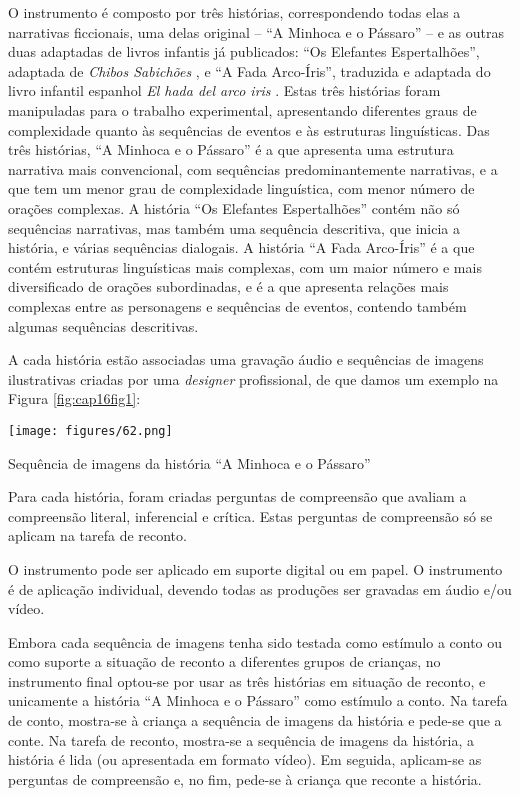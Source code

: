 \documentclass[output=paper,colorlinks,citecolor=brown,booklanguage=portuguese]{langscibook}
\begin{document}
O instrumento é composto por três histórias, correspondendo todas elas a narrativas ficcionais, uma delas original – “A Minhoca e o Pássaro” – e as outras duas adaptadas de livros infantis já publicados: “Os Elefantes Espertalhões”, adaptada de \emph{Chibos Sabichões} \citep{Gonzalez2016}, e “A Fada Arco-Íris”, traduzida e adaptada do livro infantil espanhol \emph{El hada del arco iris} \citep{Yebras2015}. Estas três histórias foram manipuladas para o trabalho experimental, apresentando diferentes graus de complexidade quanto às sequências de eventos e às estruturas linguísticas. Das três histórias, “A Minhoca e o Pássaro” é a que apresenta uma estrutura narrativa mais convencional, com sequências predominantemente narrativas, e a que tem um menor grau de complexidade linguística, com menor número de orações complexas. A história “Os Elefantes Espertalhões” contém não só sequências narrativas, mas também uma sequência descritiva, que inicia a história, e várias sequências dialogais. A história “A Fada Arco-Íris” é a que contém estruturas linguísticas mais complexas, com um maior número e mais diversificado de orações subordinadas, e é a que apresenta relações mais complexas entre as personagens e sequências de eventos, contendo também algumas sequências descritivas. 

A cada história estão associadas uma gravação áudio e sequências de imagens ilustrativas criadas por uma \emph{designer} profissional, de que damos um exemplo na Figura \ref{fig:cap16fig1}:
\begin{Figura}
    \texttt{[image: figures/62.png]}

    \caption{Sequência de imagens da história “A Minhoca e o Pássaro”}
    \label{fig:cap16fig1}
\end{Figura}

Para cada história, foram criadas perguntas de compreensão que avaliam a compreensão literal, inferencial e crítica. Estas perguntas de compreensão só se aplicam na tarefa de reconto.

O instrumento pode ser aplicado em suporte digital ou em papel. O instrumento é de aplicação individual, devendo todas as produções ser gravadas em áudio e/ou vídeo.

Embora cada sequência de imagens tenha sido testada como estímulo a conto ou como suporte a situação de reconto a diferentes grupos de crianças, no instrumento final optou-se por usar as três histórias em situação de reconto, e unicamente a história “A Minhoca e o Pássaro” como estímulo a conto. Na tarefa de conto, mostra-se à criança a sequência de imagens da história e pede-se que a conte. Na tarefa de reconto, mostra-se a sequência de imagens da história, a história é lida (ou apresentada em formato vídeo). Em seguida, aplicam-se as perguntas de compreensão e, no fim, pede-se à criança que reconte a história. 
\end{document}
